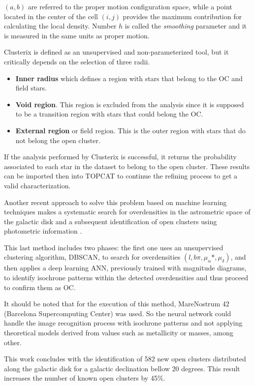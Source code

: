 \documentclass[11pt,a4paper,USenglish,twocolumn]{article}
\begin{document}
$\left( a, b \right)$ are referred to the proper motion configuration space,
while a point located in the center of the cell $\left( i, j \right)$
provides the maximum contribution for calculating the local density.
Number $h$ is called the \emph{smoothing} parameter and it is measured
in the same units as proper motion.

Clusterix is defined as an unsupervised and non-parameterized tool, but it
critically depends on the selection of three radii.

\begin{itemize}
  \item \textbf{Inner radius} which defines a region with stars that belong to the OC and field stars.
  \item \textbf{Void region}. This region is excluded from the analysis since it is supposed
                to be a transition region with stars that could belong the OC.
  \item \textbf{External region} or field region.
                This is the outer region with stars that do not belong the open cluster.
\end{itemize}

If the analysis performed by Clusterix is successful, it returns the probability
associated to each star in the dataset to belong to the open cluster.
These results can be imported then into TOPCAT to continue the refining process to
get a valid characterization.

Another recent approach to solve this problem based on machine learning techniques
makes a systematic search for overdensities in the astrometric space of the galactic
disk and a subsequent identification of open clusters using photometric information
\cite{castro2020hunting}.

This last method includes two phases: the first one uses an unsupervised clustering
algorithm, DBSCAN, to search for overdensities $(l, b \pi, \mu_{\alpha} *, \mu_{\delta})$,
and then applies a deep learning ANN, previously trained with magnitude diagrams,
to identify isochrone patterns within the detected overdensities and thus proceed
to confirm them as OC.

It should be noted that for the execution of this method, MareNostrum 42
(Barcelona Supercomputing Center) was used.
So the neural network could handle the image recognition process with
isochrone patterns and not applying theoretical models derived from
values such as metallicity or masses, among other.

This work concludes with the identification of 582 new open clusters
distributed along the galactic disk for a galactic declination bellow 20 degrees.
This result increases the number of known open clusters by 45\%.
\end{document}

